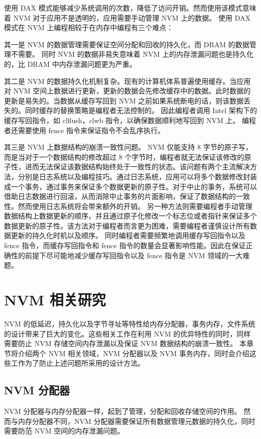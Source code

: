 使用 DAX 模式能够减少系统调用的次数，降低了访问开销。然而使用该模式意味着 NVM 对于应用不是透明的，应用需要手动管理 NVM 上的数据。
使用 DAX 模式在 NVM 上编程相较于在内存中编程有三个难点：

其一是 NVM 的数据管理需要保证空间分配和回收的持久化，而 DRAM 的数据管理不需要。
同时 NVM 的数据非易失意味着 NVM 上的内存泄漏问题也是持久化的，比 DRAM 中内存泄漏问题更为严重。

其二是 NVM 的数据持久化机制复杂。现有的计算机体系普遍使用缓存。当应用对 NVM 空间上数据进行更新，更新的数据会先修改缓存中的数据。此时数据的更新是易失的。当数据从缓存写回到 NVM 之前如果系统断电的话，则该数据丢失的。同时缓存的替换策略是编程者无法控制的。
因此编程者调用 Intel 架构下的缓存写回指令，如 clflush，clwb 指令，以确保数据顺利地写回到 NVM 上。
编程者还需要使用 fence 指令来保证指令不会乱序执行。

其三是 NVM 上数据结构的崩溃一致性问题。
NVM 仅能支持 8 字节的原子写，而是当对于一个数据结构的修改超过 8 个字节时，编程者就无法保证该修改的原子性，进而无法保证该数据结构始终处于一致性的状态。该问题有两个主流解决方法，分别是日志系统以及编程技巧。通过日志系统，应用可以将多个数据修改封装成一个事务，通过事务来保证多个数据更新的原子性。对于中止的事务，系统可以借助日志数据进行回滚，从而消除中止事务的片面影响，保证了数据结构的一致性。然而使用日志系统将会带来额外的开销。
另一种方法则需要编程者手动管理数据结构上数据更新的顺序，并且通过原子化修改一个标志位或者指针来保证多个数据更新的原子性。该方法对于编程者而言更为困难，需要编程者谨慎设计所有数据更新的持久化时机以及顺序。
同时编程者需要频繁地调用缓存写回指令以及 fence 指令，而缓存写回指令和 fence 指令的数量会显著影响性能。因此在保证正确性的前提下尽可能地减少缓存写回指令以及 fence 指令是 NVM 领域的一大难题。

\section{NVM 相关研究}

NVM 的低延迟，持久化以及字节寻址等特性给内存分配器，事务内存，文件系统的设计带来了巨大的变化。这些相关工作在利用 NVM 的优异特性的同时，同样需要防止 NVM 存储空间内存泄漏以及保证 NVM 数据结构的崩溃一致性。
本章节将介绍两个 NVM 相关领域，NVM 分配器以及 NVM 事务内存，同时会介绍这些工作为了防止上述问题所采用的设计方法。

\subsection{NVM 分配器}

NVM 分配器与内存分配器一样，起到了管理，分配和回收存储空间的作用。
然而与内存分配器不同，NVM 分配器需要保证所有数据管理元数据的持久化，同时需要防范 NVM 空间的内存泄漏问题。

